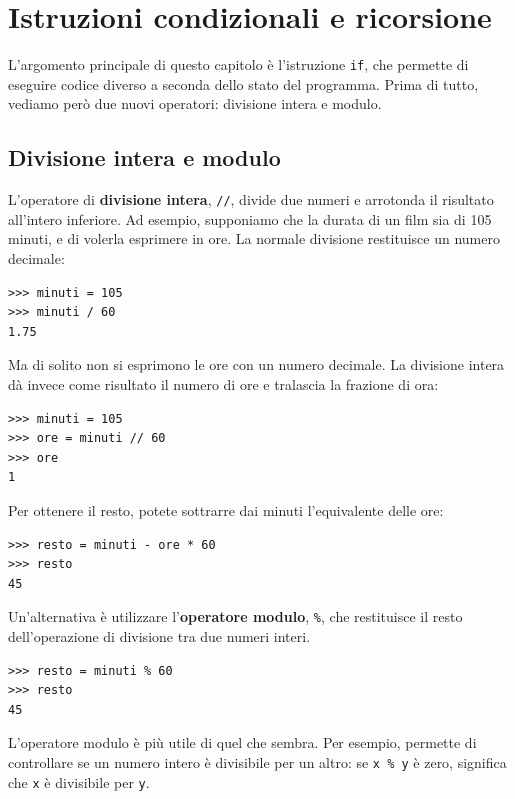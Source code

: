 \documentclass[10pt]{book}
\begin{document}
\chapter{Istruzioni condizionali e ricorsione}

L'argomento principale di questo capitolo è l'istruzione {\tt if}, che permette di eseguire codice diverso a seconda dello stato del programma. Prima di tutto, vediamo però due nuovi operatori: divisione intera e modulo.

\section{Divisione intera e modulo}

L'operatore di {\bf divisione intera}, \verb"//", divide due numeri e arrotonda il risultato all'intero inferiore. Ad esempio, supponiamo che la durata di un film sia di 105 minuti, e di volerla esprimere in ore. La normale divisione  restituisce un numero decimale:

\begin{verbatim}
>>> minuti = 105
>>> minuti / 60
1.75
\end{verbatim}

Ma di solito non si esprimono le ore con un numero decimale. La divisione intera dà invece come risultato il numero di ore e tralascia la frazione di ora:

\begin{verbatim}
>>> minuti = 105
>>> ore = minuti // 60
>>> ore
1
\end{verbatim}

Per ottenere il resto, potete sottrarre dai minuti l'equivalente delle ore:

\begin{verbatim}
>>> resto = minuti - ore * 60
>>> resto
45
\end{verbatim}


Un'alternativa è utilizzare l'{\bf operatore modulo}, \verb"%", che 
restituisce il resto dell'operazione di divisione tra due numeri interi.

\begin{verbatim}
>>> resto = minuti % 60
>>> resto
45
\end{verbatim}
%

L'operatore modulo è più utile di quel che sembra. Per esempio, permette di controllare se un numero intero è divisibile per un altro: se
{\tt x \% y} è zero, significa che {\tt x} è divisibile per {\tt y}.
\end{document}
